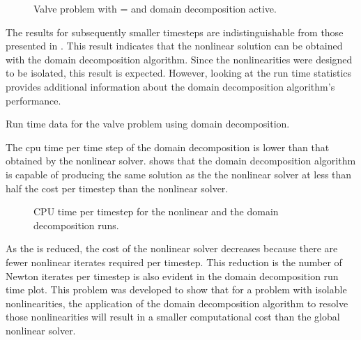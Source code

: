 \begin{figure}[h!t]
\centering

\caption{Valve problem with \dtmax{} =  and domain decomposition active.}
\label{fig:valveDom6pt25em02}
\end{figure}

The results for subsequently smaller timesteps are indistinguishable from those presented in .
This result indicates that the nonlinear solution can be obtained with the domain decomposition algorithm.
Since the nonlinearities were designed to be isolated, this result is expected.
However, looking at the run time statistics provides additional information about the domain decomposition algorithm's performance.

\begin{table}[h!t]
\centering
\singlespace

\caption{Run time data for the valve problem using domain decomposition.}
\label{tab:valveDomDataTable}
\end{table}

The cpu time per time step of the domain decomposition is lower than that obtained by the nonlinear solver.
 shows that the domain decomposition algorithm is capable of producing the same solution as the the nonlinear solver at less than half the cost per timestep than the nonlinear solver.

\begin{figure}[h!t]
\centering

\caption{CPU time per timestep for the nonlinear and the domain decomposition runs.}
\label{fig:valveRunTime}
\end{figure}

As the \dtmax{} is reduced, the cost of the nonlinear solver decreases because there are fewer nonlinear iterates required per timestep.
This reduction is the number of Newton iterates per timestep is also evident in the domain decomposition run time plot.
This problem was developed to show that for a problem with isolable nonlinearities, the application of the domain decomposition algorithm to resolve those nonlinearities will result in a smaller computational cost than the global nonlinear solver.


